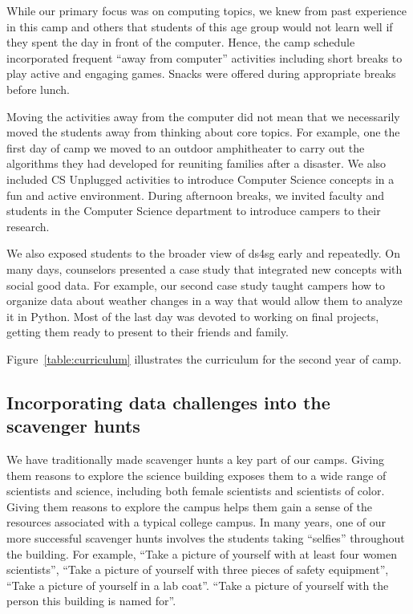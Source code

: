 While our primary focus was on computing topics, we knew from past
experience in this camp and others that students of this age group
would not learn well if they spent the day in front of the computer.
Hence, the camp schedule incorporated frequent ``away from computer''
activities including short breaks to play active and engaging games.
Snacks were offered during appropriate breaks before lunch. 

Moving the activities away from the computer did not mean that we
necessarily moved the students away from thinking about core topics.
For example, one the first day of camp we moved to an outdoor
amphitheater to carry out the algorithms they had developed for
reuniting families after a disaster.  We also included CS Unplugged
\cite{csunplugged} activities to introduce Computer Science concepts
in a fun and active environment.  During afternoon breaks, we invited
faculty and students in the Computer Science department to introduce
campers to their research.

We also exposed students to the broader view of ds4sg early and
repeatedly.  On many days, counselors presented a case study that
integrated new concepts with social good data. For example, our
second case study taught campers how to organize data about weather
changes in a way that would allow them to analyze it in Python.
Most of the last day was devoted to working on final projects,
getting them ready to present to their friends and family.

Figure~\ref{table:curriculum} illustrates the curriculum for the
second year of camp.

\subsection{Incorporating data challenges into the scavenger hunts}

We have traditionally made scavenger hunts a key part of our camps.
Giving them reasons to explore the science building exposes them
to a wide range of scientists and science, including both female
scientists and scientists of color.  Giving them reasons to explore
the campus helps them gain a sense of the resources associated with
a typical college campus.  In many years, one of our more successful
scavenger hunts involves the students taking ``selfies'' throughout
the building.  For example, ``Take a picture of yourself with at
least four women scientists'', ``Take a picture of yourself with
three pieces of safety equipment'', ``Take a picture of yourself
in a lab coat''.  ``Take a picture of yourself with the person this
building is named for''.

